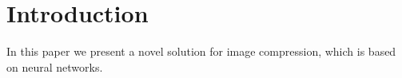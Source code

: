 
\section{Introduction}

In this paper we present a novel solution for image compression, which is based on neural networks. 